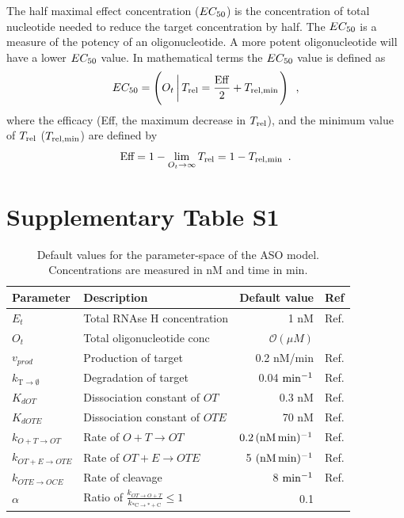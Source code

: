 \documentclass[a4paper,11pt]{article}
\newcommand{\vd}{k_{\mathrm{T \to \emptyset}}}
\newcommand{\Trel}{T_{\rm{rel}}}
\newcommand{\EC}{EC_{\rm{50}}}
\newcommand{\Trelmin}{T_{\rm{rel,min}}}
\begin{document}
The half maximal effect concentration ($\EC$) is the concentration of total nucleotide needed to reduce the target concentration by half. The $\EC$ is a measure of the potency of an oligonucleotide. A more potent oligonucleotide will have a lower $\EC$ value. In mathematical terms the $\EC$ value is defined as
\begin{equation}
\EC = \left(O_t \left|\, \Trel = \frac{\mathrm{Eff}}{2}+\Trelmin \right.\right)  \enspace, \label{eq::EC50}
\end{equation}
where the efficacy (Eff, the maximum decrease in $\Trel$), and the minimum value of $\Trel$ ($\Trelmin$) are defined by
\begin{equation}
\textrm{Eff}=1-\lim_{O_t \to \infty} \Trel =1 - \Trelmin \label{eq:Eff} \enspace.
\end{equation}


\section{Supplementary Table S1}
\begin{table}[!h]
\caption{Default values for the parameter-space of the ASO model. Concentrations are measured in nM and time in min.}\label{tb::par}
\setlength\extrarowheight{5pt}  %
\begin{tabular}{| l | l | r | l |}
\hline
Parameter & Description &Default value & Ref  \\
\hline
$E_t$ & Total RNAse H concentration & 1 nM & Ref. \cite{Amirkhanov:2002vo}\\
$O_t$ & Total oligonucleotide conc & $\mathcal{O}(\mu M )$ & {}\\
$v_{prod}$ & Production of target & 0.2 nM/min & Ref. \cite{lodish2008molecular}\\
$\vd$ & Degradation of target & 0.04 $\rm{min}^{-1}$ & Ref. \cite{Yang:2003ja}\\
$K_{dOT}$ & Dissociation constant of $OT$ & 0.3 nM & Ref. \cite{Christensen:2001te} \\
$K_{dOTE}$ & Dissociation constant of $OTE$  & 70 nM & Ref. \cite{Amirkhanov:2002vo} \\
$k_{O+T \to OT }$ & Rate of $O+T \to OT$ & $0.2 \, (\rm{nM \,min})^{-1}$ & Ref. \cite{Christensen:2001te}\\
$k_{OT+E \to OTE}$ & Rate of $OT+E \to OTE$  & 5 $(\rm{nM \,min})^{-1}$ & Ref. \cite{Amirkhanov:2002vo}\\
$k_{OTE \to OCE}$ & Rate of cleavage  & 8 $\rm{min}^{-1}$ & Ref. \cite{Amirkhanov:2002vo}\\
$\alpha$ & Ratio of $\frac{k_{OT \to O+T}}{k_{\mathrm{*C \to *+C}}} \le 1$ & 0.1  & {}\\
\hline
\end{tabular}
\end{table}
\end{document}
